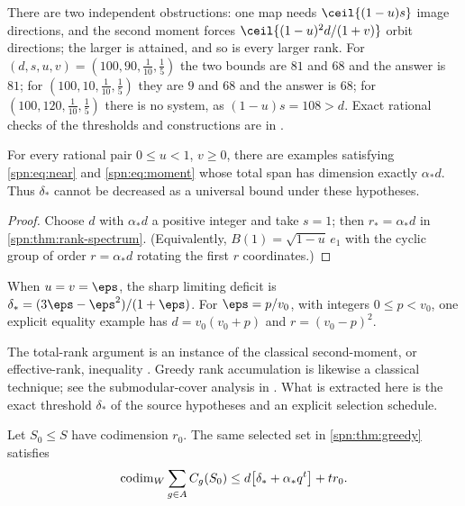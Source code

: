 There are two independent obstructions: one map needs $\ceil{(1-u)s}$ image directions, and the
second moment forces $\ceil{(1-u)^2d/(1+v)}$ orbit directions; the larger is attained, and so is every
larger rank. For $(d,s,u,v)=(100,90,\tfrac1{10},\tfrac15)$ the two bounds are $81$ and $68$ and the
answer is $81$; for $(100,10,\tfrac1{10},\tfrac15)$ they are $9$ and $68$ and the answer is $68$; for
$(100,120,\tfrac1{10},\tfrac15)$ there is no system, as $(1-u)s=108>d$. Exact rational checks of the
thresholds and constructions are in
.

\begin{corollary}\label{spn:prop:sharp}
For every rational pair $0\le u<1$, $v\ge0$, there are examples satisfying
\eqref{spn:eq:near} and \eqref{spn:eq:moment} whose total span has dimension
exactly $\alpha_*d$. Thus $\delta_*$ cannot be decreased as a universal bound
under these hypotheses.
\end{corollary}

\begin{proof}
Choose $d$ with $\alpha_*d$ a positive integer and take $s=1$; then $r_*=\alpha_*d$ in
\cref{spn:thm:rank-spectrum}. (Equivalently, $B(1)=\sqrt{1-u}\,e_1$ with the cyclic group of order
$r=\alpha_*d$ rotating the first $r$ coordinates.)
\end{proof}

\begin{corollary}\label{spn:cor:equal}
When $u=v=\eps$, the sharp limiting deficit is
$\delta_*=(3\eps-\eps^2)/(1+\eps)$. For $\eps=p/v_0$, with integers
$0\le p<v_0$, one explicit equality example has $d=v_0(v_0+p)$ and
$r=(v_0-p)^2$.
\end{corollary}

The total-rank argument is an instance of the classical second-moment, or
effective-rank, inequality \cite{Welch1974Lower,Mixon2020Three}. Greedy rank
accumulation is likewise a classical technique; see the submodular-cover
analysis in \cite{Wolsey1982Analysis}. What is extracted here is the exact
threshold $\delta_*$ of the source hypotheses and an explicit selection
schedule.

\begin{lemma}\label{spn:lem:restriction}
Let $S_0\le S$ have codimension $r_0$. The same selected set in
\cref{spn:thm:greedy} satisfies
\begin{equation}\label{spn:eq:restricted}
 \operatorname{codim}_W\sum_{g\in A}C_g(S_0)\le d\bigl[\delta_*+\alpha_*q^t\bigr]+tr_0 .
\end{equation}
\end{lemma}

